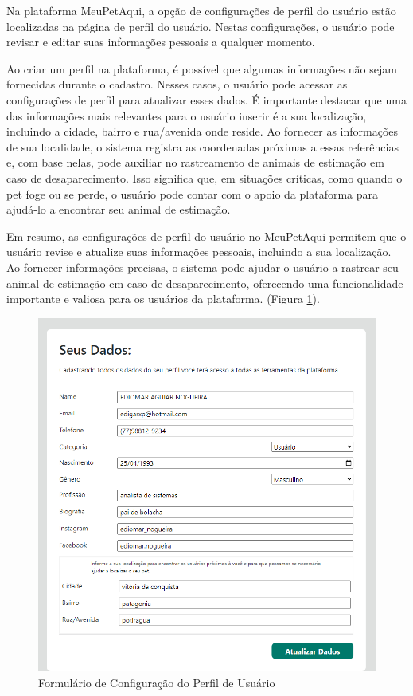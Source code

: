 Na plataforma MeuPetAqui, a opção de configurações de perfil do usuário estão localizadas na página de perfil do usuário. Nestas configurações, o usuário pode revisar e editar suas informações pessoais a qualquer momento.

Ao criar um perfil na plataforma, é possível que algumas informações não sejam fornecidas durante o cadastro. Nesses casos, o usuário pode acessar as configurações de perfil para atualizar esses dados. É importante destacar que uma das informações mais relevantes para o usuário inserir é a sua localização, incluindo a cidade, bairro e rua/avenida onde reside. Ao fornecer as informações de sua localidade, o sistema registra as coordenadas próximas a essas referências e, com base nelas, pode auxiliar no rastreamento de animais de estimação em caso de desaparecimento. Isso significa que, em situações críticas, como quando o pet foge ou se perde, o usuário pode contar com o apoio da plataforma para ajudá-lo a encontrar seu animal de estimação.

\newpage
Em resumo, as configurações de perfil do usuário no MeuPetAqui permitem que o usuário revise e atualize suas informações pessoais, incluindo a sua localização. Ao fornecer informações precisas, o sistema pode ajudar o usuário a rastrear seu animal de estimação em caso de desaparecimento, oferecendo uma funcionalidade importante e valiosa para os usuários da plataforma. (Figura \ref{fig:FormulárioCPerfilUsuário}).


\begin{figure}[htb]
     \centering
     \includegraphics[width=14cm]{arquivos/Figuras/image25.png}
     \caption{Formulário de Configuração do Perfil de Usuário}
     \label{fig:FormulárioCPerfilUsuário}
\end{figure}

